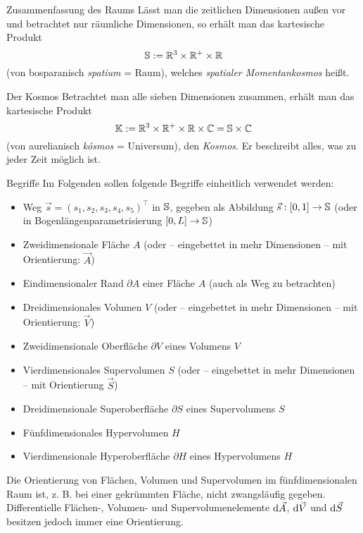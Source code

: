 \begin{bla}{Zusammenfassung des Raums}
Lässt man die zeitlichen Dimensionen außen vor und betrachtet nur räumliche Dimensionen, so erhält man das kartesische Produkt
\begin{equation}
\mathbb{S}:=\mathbb{R}^3\times\mathbb{R}^+\times\mathbb{R}
\end{equation}
(von bosparanisch \emph{spatium} = Raum), welches \emph{spatialer Momentankosmos} heißt.
\end{bla}
\begin{bla}{Der Kosmos}
Betrachtet man alle sieben Dimensionen zusammen, erhält man das kartesische Produkt
\begin{equation}
\mathbb{K}:=\mathbb{R}^3\times\mathbb{R}^+\times\mathbb{R}\times\mathbb{C}=\mathbb{S}\times\mathbb{C}
\end{equation}
(von aurelianisch \emph{kósmos} = Universum), den \emph{Kosmos}. Er beschreibt alles, was zu jeder Zeit möglich ist.
\end{bla}
\begin{bla}{Begriffe}
Im Folgenden sollen folgende Begriffe einheitlich verwendet werden:
\begin{itemize}
\item
Weg $\vec{s}=(s_1,s_2,s_3,s_4,s_5)^\top$ in $\mathbb{S}$, gegeben als Abbildung $\vec{s}: [0,1]\to\mathbb{S}$ (oder in Bogenlängenparametrisierung $[0,L]\to\mathbb{S}$)
\item
Zweidimensionale Fläche $A$ (oder -- eingebettet in mehr Dimensionen -- mit Orientierung: $\vec{A}$)
\item
Eindimensionaler Rand $\partial A$ einer Fläche $A$ (auch als Weg zu betrachten)
\item
Dreidimensionales Volumen $V$ (oder -- eingebettet in mehr Dimensionen -- mit Orientierung: $\vec{V}$)
\item
Zweidimensionale Oberfläche $\partial V$ eines Volumens $V$
\item
Vierdimensionales Supervolumen $S$ (oder -- eingebettet in mehr Dimensionen -- mit Orientierung $\vec{S}$)
\item
Dreidimensionale Superoberfläche $\partial S$ eines Supervolumens $S$
\item
Fünfdimensionales Hypervolumen $H$
\item
Vierdimensionale Hyperoberfläche $\partial H$ eines Hypervolumens $H$
\end{itemize}
Die Orientierung von Flächen, Volumen und Supervolumen im fünfdimensionalen Raum ist, z. B. bei einer gekrümmten Fläche, nicht zwangsläufig gegeben. Differentielle Flächen-, Volumen- und Supervolumenelemente $\text{\rmfamily d} \vec{A}$, $\text{\rmfamily d} \vec{V}$ und $\text{\rmfamily d} \vec{S}$ besitzen jedoch immer eine Orientierung.
\end{bla}